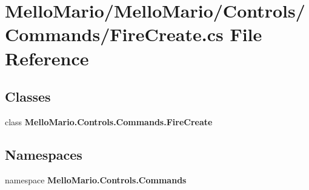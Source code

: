 \section{Mello\+Mario/\+Mello\+Mario/\+Controls/\+Commands/\+Fire\+Create.cs File Reference}
\label{FireCreate_8cs}
\subsection*{Classes}
\begin{DoxyCompactItemize}
\item 
class \textbf{ Mello\+Mario.\+Controls.\+Commands.\+Fire\+Create}
\end{DoxyCompactItemize}
\subsection*{Namespaces}
\begin{DoxyCompactItemize}
\item 
namespace \textbf{ Mello\+Mario.\+Controls.\+Commands}
\end{DoxyCompactItemize}
